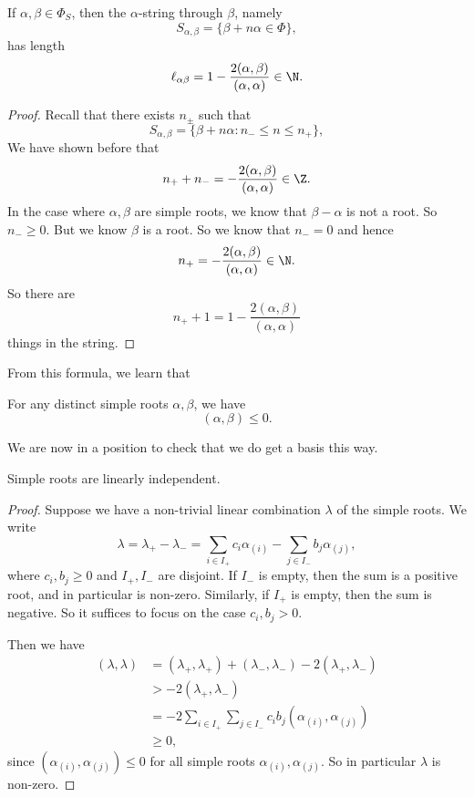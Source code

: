 \documentclass[a4paper]{article}
\begin{document}
\begin{prop}
  If $\alpha, \beta \in \Phi_S$, then the $\alpha$-string through $\beta$, namely
  \[
    S_{\alpha, \beta} = \{\beta + n \alpha \in \Phi\},
  \]
  has length
  \[
    \ell_{\alpha\beta} = 1 - \frac{2 (\alpha, \beta)}{(\alpha, \alpha)} \in \N.
  \]
\end{prop}

\begin{proof}
  Recall that there exists $n_{\pm}$ such that
  \[
    S_{\alpha, \beta} = \{\beta + n \alpha: n_- \leq n \leq n_+\},
  \]
  We have shown before that
  \[
    n_+ + n_- = - \frac{2(\alpha, \beta)}{(\alpha, \alpha)} \in \Z.
  \]
  In the case where $\alpha, \beta$ are simple roots, we know that $\beta - \alpha$ is not a root. So $n_- \geq 0$. But we know $\beta$ is a root. So we know that $n_- = 0$ and hence
  \[
    n_+ = -\frac{2(\alpha, \beta)}{(\alpha, \alpha)} \in \N.
  \]
  So there are
  \[
    n_+ + 1 = 1 - \frac{2(\alpha, \beta)}{(\alpha, \alpha)}
  \]
  things in the string.
\end{proof}
From this formula, we learn that

\begin{cor}
  For any distinct simple roots $\alpha, \beta$, we have
  \[
    (\alpha, \beta) \leq 0.
  \]
\end{cor}

We are now in a position to check that we do get a basis this way.

\begin{prop}
  Simple roots are linearly independent.
\end{prop}

\begin{proof}
  Suppose we have a non-trivial linear combination $\lambda$ of the simple roots. We write
  \[
    \lambda = \lambda_+ - \lambda_- = \sum_{i \in I_+} c_i \alpha_{(i)} - \sum_{j \in I_-} b_j \alpha_{(j)},
  \]
  where $c_i, b_j \geq 0$ and $I_+, I_-$ are disjoint. If $I_-$ is empty, then the sum is a positive root, and in particular is non-zero. Similarly, if $I_+$ is empty, then the sum is negative. So it suffices to focus on the case $c_i, b_j > 0$.
  
  Then we have
  \begin{align*}
    (\lambda, \lambda) &= (\lambda_+, \lambda_+) + (\lambda_-, \lambda_-) - 2 (\lambda_+, \lambda_-)\\
    &> -2(\lambda_+, \lambda_-)\\
    &= -2 \sum_{i \in I_+}\sum_{j \in I_-} c_i b_j (\alpha_{(i)}, \alpha_{(j)})\\
    &\geq 0,
  \end{align*}
  since $(\alpha_{(i)}, \alpha_{(j)}) \leq 0$ for all simple roots $\alpha_{(i)}, \alpha_{(j)}$. So in particular $\lambda$ is non-zero.
\end{proof}
\end{document}
